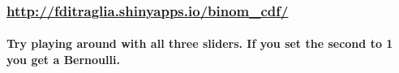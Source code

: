 \documentclass[handout]{beamer}
\begin{document}
\begin{frame}
	\frametitle{\href{https://fditraglia.shinyapps.io/binom_cdf/}{http://fditraglia.shinyapps.io/binom\_cdf/}}
\framesubtitle{Try playing around with all three sliders. If you set the second to 1 you get a Bernoulli.}

\begin{figure}
\end{figure}

\end{frame}

\end{document}
